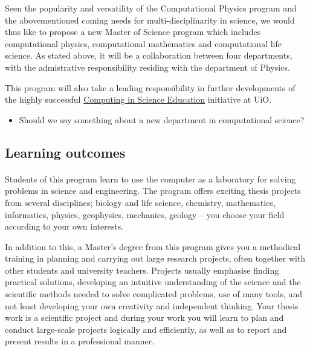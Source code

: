 \documentclass[%
twoside,                 %
final,                   %
10pt]{article}
\begin{document}
Seen the popularity and versatility of the Computational Physics program and the abovementioned coming needs for multi-disciplinarity in science, we would thus like to propose a new Master of Science program which includes computational physics, computational mathematics and computational life science. As stated above, it will be a collaboration between four departments, with the admistrative responsibility residing with the department of Physics. 

This program will also take a leading responsibility in further
developments of the highly successful \href{{http://www.mn.uio.no/english/about/collaboration/cse/}}{Computing in Science Education} initiative at UiO. 

\begin{itemize}
\item Should we say something about a new department in computational science?
\end{itemize}

\noindent








\subsection{Learning outcomes}

\paragraph{}

Students of this program learn to use the computer as a laboratory for solving problems in science and engineering. The program offers exciting thesis projects from several disciplines; biology and life science, chemistry, mathematics, informatics, physics, geophysics, mechanics, geology  – you choose your  field according to your own interests.

In addition to this, a Master’s degree from this program gives you a
methodical training in planning and carrying out large research
projects, often together with other students and university
teachers. Projects usually emphasise finding practical solutions,
developing an intuitive understanding of the science and the
scientific methods needed to solve complicated problems, use of many
tools, and not least developing your own creativity and independent
thinking. Your thesis work is a scientific  project and during your work you will
learn to plan and conduct large-scale projects logically and efficiently, as well as
to report and present results in a professional manner.
\end{document}
